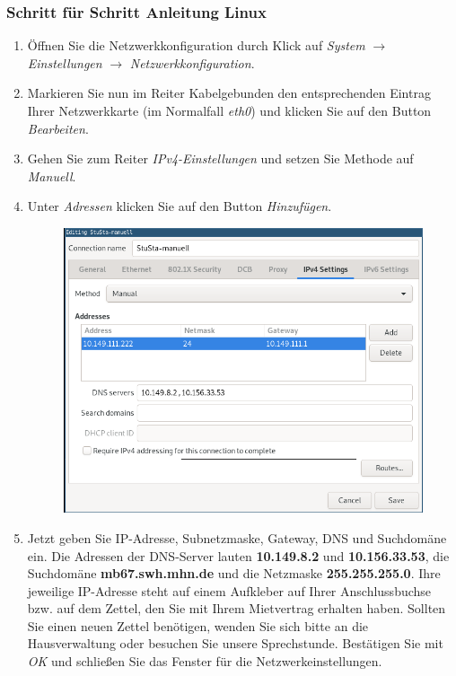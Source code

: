 \documentclass[a4paper,12pt]{scrartcl}
\begin{document}
\subsubsection*{Schritt für Schritt Anleitung Linux}

\begin{enumerate}
	\item Öffnen Sie die Netzwerkkonfiguration durch Klick auf \emph{System} $\rightarrow$ \emph{Einstellungen} $\rightarrow$ \emph{Netzwerkkonfiguration}.
	\item Markieren Sie nun im Reiter Kabelgebunden den entsprechenden Eintrag Ihrer Netzwerkkarte (im Normalfall \emph{eth0}) und klicken Sie auf den Button \emph{Bearbeiten}.
	\item Gehen Sie zum Reiter \emph{IPv4-Einstellungen} und setzen Sie Methode auf \emph{Manuell}.
	\item Unter \emph{Adressen} klicken Sie auf den Button \emph{Hinzufügen}.
	\begin{figure}[h!]
	\centering
		\begin{minipage}[c]{0.5\linewidth}
			\centering
			\includegraphics[width=0.9\linewidth,keepaspectratio]{Bilder/IP_Linux_mb_neu}
			\vspace{-15pt}
		\end{minipage}
	\end{figure}
	\item Jetzt geben Sie IP-Adresse, Subnetzmaske, Gateway, DNS und Suchdomäne ein. Die Adressen der DNS-Server lauten \textbf{10.149.8.2} und \textbf{10.156.33.53}, die Suchdomäne \textbf{mb67.swh.mhn.de} und die Netzmaske \textbf{255.255.255.0}. Ihre jeweilige IP-Adresse steht auf einem Aufkleber auf Ihrer Anschlussbuchse bzw. auf dem Zettel, den Sie mit Ihrem Mietvertrag erhalten haben. Sollten Sie einen neuen Zettel benötigen, wenden Sie sich bitte an die Hausverwaltung oder besuchen Sie unsere Sprechstunde. Bestätigen Sie mit \emph{OK} und schließen Sie das Fenster für die Netzwerkeinstellungen.
\end{enumerate}
\end{document}
